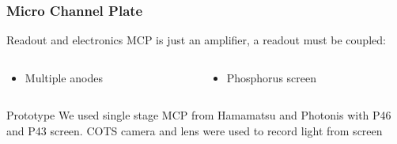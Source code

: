 \begin{frame}
  \frametitle{Micro Channel Plate}
  \begin{block}{Readout and electronics}
    MCP is just an amplifier, a readout must be coupled:
    \begin{columns}[T]
      \begin{column}{0.45\textwidth}
        \begin{itemize}
          \item Multiple anodes
        \end{itemize}
      \end{column}
      \begin{column}{0.45\textwidth}
        \begin{itemize}
          \item Phosphorus screen
        \end{itemize}
      \end{column}
    \end{columns}
  \end{block}
  \begin{block}{Prototype}
    We used single stage MCP from Hamamatsu and Photonis with P46 and P43 screen. COTS camera and lens were used to record light from screen
  \end{block}


\end{frame}

